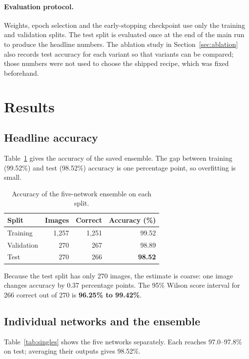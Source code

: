 \documentclass[11pt,a4paper]{article}
\begin{document}
\paragraph{Evaluation protocol.} Weights, epoch selection and the early-stopping checkpoint use only the training and validation splits. The test split is evaluated once at the end of the main run to produce the headline numbers. The ablation study in Section~\ref{sec:ablation} also records test accuracy for each variant so that variants can be compared; those numbers were not used to choose the shipped recipe, which was fixed beforehand.

\section{Results}
\subsection{Headline accuracy}
Table~\ref{tab:main} gives the accuracy of the saved ensemble. The gap between training (99.52\%) and test (98.52\%) accuracy is one percentage point, so overfitting is small.

\begin{table}[H]
\centering
\begin{tabular}{lrrr}
\toprule
Split & Images & Correct & Accuracy (\%)\\
\midrule
Training & 1{,}257 & 1{,}251 & 99.52\\
Validation & 270 & 267 & 98.89\\
Test & 270 & 266 & \textbf{98.52}\\
\bottomrule
\end{tabular}
\caption{Accuracy of the five-network ensemble on each split.}
\label{tab:main}
\end{table}

Because the test split has only 270 images, the estimate is coarse: one image changes accuracy by 0.37 percentage points. The 95\% Wilson score interval for 266 correct out of 270 is \textbf{96.25\% to 99.42\%}.

\subsection{Individual networks and the ensemble}
Table~\ref{tab:singles} shows the five networks separately. Each reaches 97.0--97.8\% on test; averaging their outputs gives 98.52\%.
\end{document}
